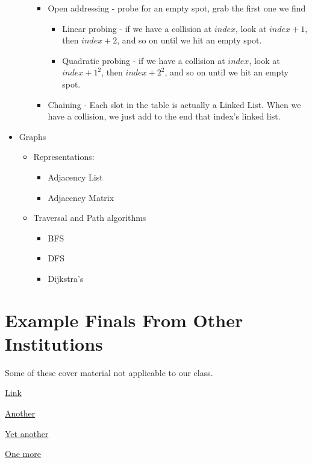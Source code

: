 \documentclass[]{article}
\begin{document}
\begin{itemize}
\begin{itemize}
\begin{itemize}
			\item Open addressing - probe for an empty spot, grab the first one we find
			\begin{itemize}
				\item Linear probing - if we have a collision at $ index $, look at $ index+1 $, then $ index + 2 $, and so on until we hit an empty spot.  
				\item Quadratic probing - if we have a collision at $ index $, look at $ index+1^{2} $, then $ index + 2^{2} $, and so on until we hit an empty spot.  
			\end{itemize}
			\item Chaining -  Each slot in the table is actually a Linked List.  When we have a collision, we just add to the end that index's linked list.
		\end{itemize}
	\end{itemize}
	\item Graphs

	\begin{itemize}
		\item Representations:
		\begin{itemize}
			\item Adjacency List
			\item Adjacency Matrix 
		\end{itemize}
		\item Traversal and Path algorithms 
		\begin{itemize}
			\item BFS
			\item DFS
			\item Dijkstra's 
		\end{itemize}

	\end{itemize}
\end{itemize}

\section{Example Finals From Other Institutions}
Some of these cover material not applicable to our class.

\href{http://www-bcf.usc.edu/~stejada/csci102/slides/final/f11-final.pdf}{Link}

\href{https://www.it.uu.se/edu/course/homepage/algdstr1/ht11/ex_tenta.pdf}{Another}


\href{https://sites.fas.harvard.edu/~cscie119/sections/practice_final.pdf}{Yet another}

\href{https://courses.cs.washington.edu/courses/cse373/07wi/exams/final.pdf}{One more}
\end{document}
